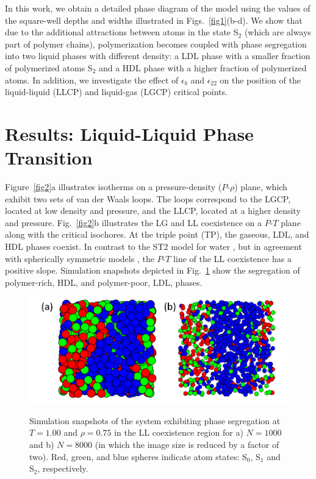 \documentclass[9pt,twocolumn,twoside,lineno]{pnas-new}
\begin{document}
In this work, we obtain a detailed phase diagram of the model using the values of the square-well depths and widths illustrated in Figs.~\ref{fig1}(b-d). We show that due to the additional attractions between atoms in the state S$_2$ (which are always part of polymer chains), polymerization becomes coupled with phase segregation into two liquid phases with different density: a LDL phase with a smaller fraction of polymerized atoms S$_2$ and a HDL phase with a higher fraction of polymerized atoms. In addition, we investigate the effect of $\epsilon_b$ and $\epsilon_{22}$ on the position of the liquid-liquid (LLCP) and liquid-gas (LGCP) critical points. 

\section*{Results: Liquid-Liquid Phase Transition}
Figure~\ref{fig2}a illustrates isotherms on a pressure-density ($P$-$\rho$) plane, which exhibit two sets of van der Waals loops. The loops correspond to the LGCP, located at low density and pressure, and the LLCP, located at a higher density and pressure. Fig.~\ref{fig2}b illustrates the LG and LL coexistence on a $P$-$T$ plane along with the critical isochores. At the triple point (TP), the gaseous, LDL, and HDL phases coexist. In contrast to the ST2 model for water \cite{Poole1992}, but in agreement with spherically symmetric models \cite{Franzese2001,Luo2015}, the  $P$-$T$ line of the LL coexistence has a positive slope. Simulation snapshots depicted in Fig.~\ref{fig6} show the segregation of polymer-rich, HDL, and polymer-poor, LDL, phases. 

\begin{figure}[t]
	\centering
{
\includegraphics[width=\linewidth]{Particle_SnapShot.png}
}
\caption{Simulation snapshots of the system exhibiting phase segregation at $T=1.00$ and $\rho=0.75$ in the LL coexistence region for a) $N = 1000$ and b) $N = 8000$ (in which the image size is reduced by a factor of two). Red, green, and blue spheres indicate atom states: S$_0$, S$_1$ and  S$_2$, respectively.}
\label{fig6}
\end{figure}
\end{document}
